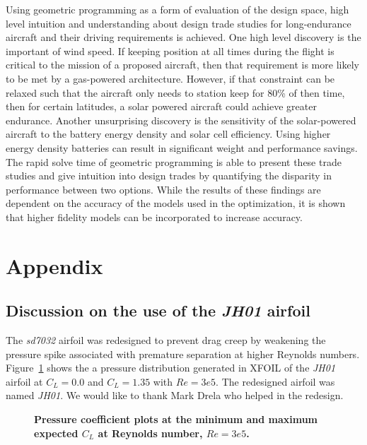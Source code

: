 \documentclass[]{aiaa-tc}%
\begin{document}
Using geometric programming as a form of evaluation of the design space, high level intuition and understanding about design trade studies for long-endurance aircraft and their driving requirements is achieved.  
One high level discovery is the important of wind speed.  
If keeping position at all times during the flight is critical to the mission of a proposed aircraft, then that requirement is more likely to be met by a gas-powered architecture.
However, if that constraint can be relaxed such that the aircraft only needs to station keep for 80\% of then time, then for certain latitudes, a solar powered aircraft could achieve greater endurance.
Another unsurprising discovery is the sensitivity of the solar-powered aircraft to the battery energy density and solar cell efficiency.  Using higher energy density batteries can result in significant weight and performance savings.  
The rapid solve time of geometric programming is able to present these trade studies and give intuition into design trades by quantifying the disparity in performance between two options.
While the results of these findings are dependent on the accuracy of the models used in the optimization, it is shown that higher fidelity models can be incorporated to increase accuracy.

\section*{Appendix}

\subsection{Discussion on the use of the \emph{JH01} airfoil}

The \emph{sd7032} airfoil was redesigned to prevent drag creep by weakening the pressure spike associated with premature separation at higher Reynolds numbers.  
Figure~\ref{f:jhcps} shows the a pressure distribution generated in XFOIL of the \emph{JH01} airfoil at $C_L=0.0$ and $C_L=1.35$ with $Re=3e5$.
The redesigned airfoil was named \emph{JH01}. We would like to thank Mark Drela who helped in the redesign.

\begin{figure}[H]
 \begin{subfigmatrix}{2}%
 \end{subfigmatrix}
 \caption{\textbf{ Pressure coefficient plots at the minimum and maximum expected $C_L$ at Reynolds number, $Re=3e5$.  }}
 \label{f:jhcps}
\end{figure}



\end{document}
